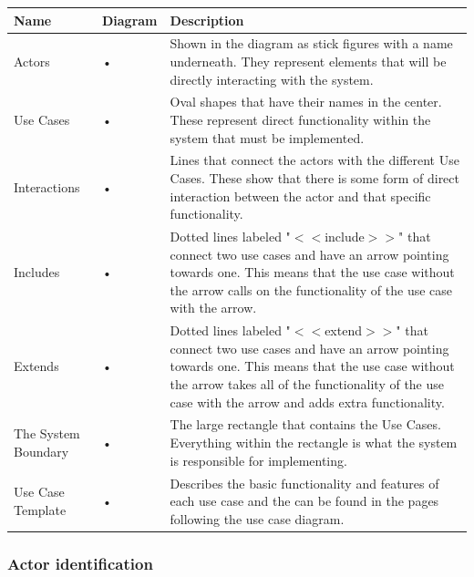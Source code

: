 \begin{tabular}{|p{2cm}|p{3cm}|p{9cm}|}
\hline 
\rule[-1ex]{0pt}{2.5ex} \textbf{Name} & \textbf{Diagram} & \textbf{Description} \\ 
\hline
\rule[-1ex]{0pt}{2.5ex}Actors & • & Shown in the diagram as stick figures with a name underneath. They represent elements that will be directly interacting with the system. \\ 
\hline 
\rule[-1ex]{0pt}{2.5ex}Use Cases & • & Oval shapes that have their names in the center. These represent direct functionality within the system that must be implemented. \\ 
\hline 
\rule[-1ex]{0pt}{2.5ex}Interactions & • & Lines that connect the actors with the different Use Cases. These show that there is some form of direct interaction between the actor and that specific functionality. \\ 
\hline 
\rule[-1ex]{0pt}{2.5ex}Includes & • & Dotted lines labeled "$<<$include$>>$" that connect two use cases and have an arrow pointing towards one. This means that the use case without the arrow calls on the functionality of the use case with the arrow. \\ 
\hline 
\rule[-1ex]{0pt}{2.5ex}Extends & • & Dotted lines labeled "$<<$extend$>>$" that connect two use cases and have an arrow pointing towards one. This means that the use case without the arrow takes all of the functionality of the use case with the arrow and adds extra functionality. \\ 
\hline 
\rule[-1ex]{0pt}{2.5ex}The System Boundary & • & The large rectangle that contains the Use Cases. Everything within the rectangle is what the system is responsible for implementing. \\ 
\hline 
\rule[-1ex]{0pt}{2.5ex}Use Case Template & • & Describes the basic functionality and features of each use case and the can be found in the pages following the use case diagram. \\ 
\hline 
\end{tabular} 




\subsubsection{Actor identification}
